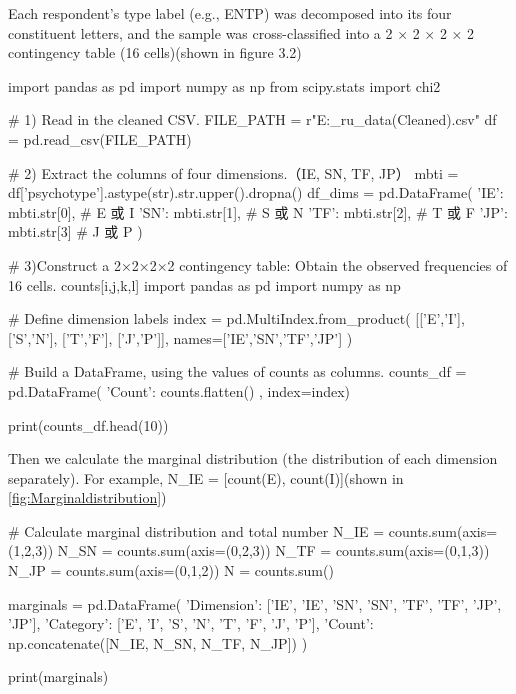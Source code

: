 \documentclass[12pt]{article}
\numberwithin{figure}{section}  %
\begin{document}
	Each respondent’s type label (e.g., ENTP) was decomposed into its four
	constituent letters, and the sample was cross-classified into a 2 × 2 × 2 ×
	2 contingency table (16 cells)(shown in figure 3.2) %
	\begin{python}
import pandas as pd
import numpy as np
from scipy.stats import chi2

# 1) Read in the cleaned CSV.
FILE_PATH = r"E:\python\kpmi_ru_data(Cleaned).csv"   
df = pd.read_csv(FILE_PATH)

# 2) Extract the columns of four dimensions.（IE, SN, TF, JP）
mbti = df['psychotype'].astype(str).str.upper().dropna()
df_dims = pd.DataFrame({
    'IE': mbti.str[0],   # E 或 I
    'SN': mbti.str[1],   # S 或 N
    'TF': mbti.str[2],   # T 或 F
    'JP': mbti.str[3]    # J 或 P
})

# 3)Construct a 2×2×2×2 contingency table: Obtain the observed frequencies of 16 cells. counts[i,j,k,l]
import pandas as pd
import numpy as np

# Define dimension labels
index = pd.MultiIndex.from_product(
    [['E','I'], ['S','N'], ['T','F'], ['J','P']],
    names=['IE','SN','TF','JP']
)

# Build a DataFrame, using the values of counts as columns.
counts_df = pd.DataFrame({
    'Count': counts.flatten()
}, index=index)

print(counts_df.head(10))
	\end{python}
	Then we calculate the marginal distribution (the distribution of each
	dimension separately). For example, N\_IE = [count(E), count(I)](shown in
	\cref{fig:Marginaldistribution}) 
	\begin{python}
# Calculate marginal distribution and total number
N_IE = counts.sum(axis=(1,2,3))
N_SN = counts.sum(axis=(0,2,3))
N_TF = counts.sum(axis=(0,1,3))
N_JP = counts.sum(axis=(0,1,2))
N = counts.sum()


marginals = pd.DataFrame({
    'Dimension': ['IE', 'IE', 'SN', 'SN', 'TF', 'TF', 'JP', 'JP'],
    'Category': ['E', 'I', 'S', 'N', 'T', 'F', 'J', 'P'],
    'Count': np.concatenate([N_IE, N_SN, N_TF, N_JP])
})


print(marginals)
	\end{python}
\end{document}
